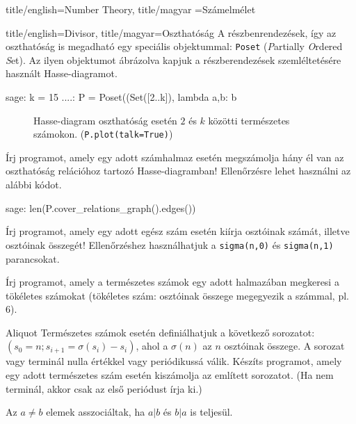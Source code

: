 \documentclass{amsbook}
\begin{document}
\begin{Part*}{
    title/english=Number Theory,
    title/magyar =Számelmélet}
\begin{Section}{
    title/english=Divisor,
    title/magyar=Oszthatóság}
  A részbenrendezések, így az oszthatóság is megadható egy speciális objektummal:
  \texttt{Poset} (\emph{P}artially \emph{O}rdered \emph{S}et).
  Az ilyen objektumot ábrázolva kapjuk a részberendezések szemléltetésére
  használt Hasse-diagramot.
  \begin{sageexample}
    sage: k = 15
    ....: P = Poset((Set([2..k]), lambda a,b: b %
  \end{sageexample}
  \begin{figure}[h!]
    \centering
    \caption{Hasse-diagram oszthatóság esetén $2$ és $k$ közötti természetes
    számokon.  (\texttt{P.plot(talk=True)})}
  \end{figure}

  \begin{exercise} Írj programot, amely egy adott számhalmaz esetén megszámolja hány
    él van az oszthatóság relációhoz tartozó  Hasse-diagramban! Ellen\H orzésre lehet 
    használni az alábbi kódot.
  \end{exercise}
  \begin{sageexample}
    sage: len(P.cover_relations_graph().edges())
  \end{sageexample}

  \begin{exercise} Írj programot, amely egy adott egész szám esetén kiírja
    osztóinak számát, illetve osztóinak összegét! Ellenőrzéshez
    használhatjuk a \verb|sigma(n,0)| és \verb|sigma(n,1)| parancsokat.
  \end{exercise}

  \begin{exercise} Írj programot, amely a természetes számok egy adott
    halmazában megkeresi a tökéletes számokat (tökéletes szám: osztóinak 
    összege megegyezik a számmal, pl. 6).
  \end{exercise}
  
  \begin{exercise}{Aliquot} Természetes számok esetén definiálhatjuk a következő
    sorozatot: $(s_0 = n; s_{i+1} = \sigma(s_i) - s_i)$, ahol a $\sigma(n)$
    az $n$ osztóinak összege. A sorozat vagy terminál nulla értékkel vagy
    periódikussá válik. Készíts programot, amely egy adott természetes szám 
    esetén kiszámolja az említett sorozatot. (Ha nem terminál, akkor csak az 
    első periódust írja ki.)
  \end{exercise}

  \begin{definition}[Asszociált] Az $a\neq b$ elemek asszociáltak, ha $a|b$ és 
    $b|a$ is teljesül.
  \end{definition}


\end{Section}
\end{Part*}
\end{document}
